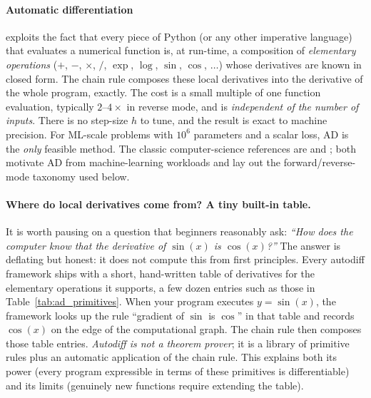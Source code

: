 \documentclass[11pt,a4paper]{report}
\begin{document}
\paragraph{Automatic differentiation} exploits the fact that every piece of Python (or any other imperative language) that evaluates a numerical function is, at run-time, a composition of \emph{elementary operations} ($+$, $-$, $\times$, $/$, $\exp$, $\log$, $\sin$, $\cos$, $\ldots$) whose derivatives are known in closed form.  The chain rule composes these local derivatives into the derivative of the whole program, exactly.  The cost is a small multiple of one function evaluation, typically $2$--$4\times$ in reverse mode, and is \emph{independent of the number of inputs}.  There is no step-size $h$ to tune, and the result is exact to machine precision.  For ML-scale problems with $10^6$ parameters and a scalar loss, AD is the \emph{only} feasible method.  The classic computer-science references are \citet{baydin2018automatic} and \citet{margossian2019review}; both motivate AD from machine-learning workloads and lay out the forward/reverse-mode taxonomy used below.

\paragraph{Where do local derivatives come from?  A tiny built-in table.}  It is worth pausing on a question that beginners reasonably ask: \emph{``How does the computer know that the derivative of $\sin(x)$ is $\cos(x)$?''}  The answer is deflating but honest: it does not compute this from first principles.  Every autodiff framework ships with a short, hand-written table of derivatives for the elementary operations it supports, a few dozen entries such as those in Table~\ref{tab:ad_primitives}.  When your program executes $y = \sin(x)$, the framework looks up the rule ``gradient of $\sin$ is $\cos$'' in that table and records $\cos(x)$ on the edge of the computational graph.  The chain rule then composes those table entries.  \emph{Autodiff is not a theorem prover}; it is a library of primitive rules plus an automatic application of the chain rule.  This explains both its power (every program expressible in terms of these primitives is differentiable) and its limits (genuinely new functions require extending the table).
\end{document}
